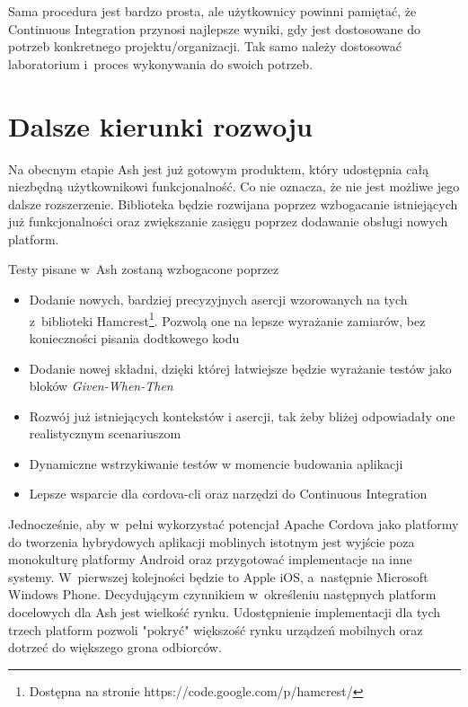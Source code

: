 \documentclass[brudnopis]{xmgr}
\begin{document}
Sama procedura jest bardzo prosta, ale użytkownicy powinni pamiętać, że Continuous Integration przynosi najlepsze wyniki, gdy jest dostosowane do potrzeb konkretnego projektu/organizacji. Tak samo należy dostosować laboratorium i~proces wykonywania do swoich potrzeb. 

\chapter{Dalsze kierunki rozwoju}

Na obecnym etapie Ash jest już gotowym produktem, który udostępnia całą niezbędną użytkownikowi funkcjonalność. Co nie oznacza, że nie jest możliwe jego dalsze rozszerzenie. Biblioteka będzie rozwijana poprzez wzbogacanie istniejących już funkcjonalności oraz zwiększanie zasięgu poprzez dodawanie obsługi nowych platform. 

Testy pisane w~Ash zostaną wzbogacone poprzez

\begin{itemize}
  \item Dodanie nowych, bardziej precyzyjnych asercji wzorowanych na tych z~biblioteki Hamcrest\footnote{Dostępna na stronie https://code.google.com/p/hamcrest/}. Pozwolą one na lepsze wyrażanie zamiarów, bez konieczności pisania dodtkowego kodu
  \item Dodanie nowej składni, dzięki której łatwiejsze będzie wyrażanie testów jako bloków \textit{Given-When-Then}
  \item Rozwój już istniejących kontekstów i asercji, tak żeby bliżej odpowiadały one realistycznym scenariuszom 
  \item Dynamiczne wstrzykiwanie testów w momencie budowania aplikacji
  \item Lepsze wsparcie dla cordova-cli oraz narzędzi do Continuous Integration
\end{itemize}

Jednocześnie, aby w~pełni wykorzystać potencjał Apache Cordova jako platformy do tworzenia hybrydowych aplikacji moblinych istotnym jest wyjście poza monokulturę platformy Android oraz przygotować implementacje na inne systemy. W~pierwszej kolejności będzie to Apple iOS, a~następnie Microsoft Windows Phone. Decydującym czynnikiem w~określeniu następnych platform docelowych dla Ash jest wielkość rynku. Udostępnienie implementacji dla tych trzech platform pozwoli "pokryć" większość rynku urządzeń mobilnych oraz dotrzeć do większego grona odbiorców. 

\summary
\end{document}
